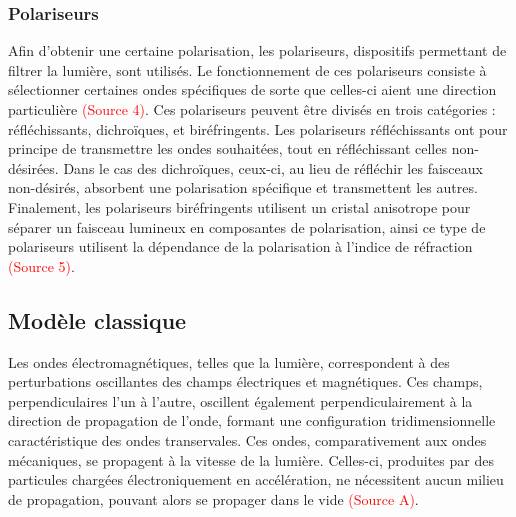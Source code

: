 \documentclass[11pt,letterpaper]{article}
\begin{document}
\subsubsection{Polariseurs}
Afin d'obtenir une certaine polarisation, les polariseurs, dispositifs permettant de filtrer la lumière, sont utilisés. Le fonctionnement de ces polariseurs consiste à sélectionner certaines ondes spécifiques de sorte que celles-ci aient une direction particulière \textcolor{red}{(Source 4)}. Ces polariseurs peuvent être divisés en trois catégories : réfléchissants, dichroïques, et biréfringents. Les polariseurs réfléchissants ont pour principe de transmettre les ondes souhaitées, tout en réfléchissant celles non-désirées. Dans le cas des dichroïques, ceux-ci, au lieu de réfléchir les faisceaux non-désirés, absorbent une polarisation spécifique et transmettent les autres. Finalement, les polariseurs biréfringents utilisent un cristal anisotrope pour séparer un faisceau lumineux en composantes de polarisation, ainsi ce type de polariseurs utilisent la dépendance de la polarisation à l'indice de réfraction \textcolor{red}{(Source 5)}.



\subsection{Modèle classique}
Les ondes électromagnétiques, telles que la lumière, correspondent à des perturbations oscillantes des champs électriques et magnétiques. Ces champs, perpendiculaires l'un à l'autre, oscillent également perpendiculairement à la direction de propagation de l'onde, formant une configuration tridimensionnelle caractéristique des ondes transervales. Ces ondes, comparativement aux ondes mécaniques, se propagent à la vitesse de la lumière. Celles-ci, produites par des particules chargées électroniquement en accélération, ne nécessitent aucun milieu de propagation, pouvant alors se propager dans le vide \textcolor{red}{(Source A)}.
\end{document}
